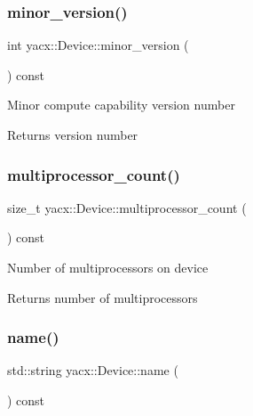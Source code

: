 \subsubsection{\texorpdfstring{minor\+\_\+version()}{minor\_version()}}
{\footnotesize\ttfamily int yacx\+::\+Device\+::minor\+\_\+version (\begin{DoxyParamCaption}{ }\end{DoxyParamCaption}) const\hspace{0.3cm}{\ttfamily [inline]}}

Minor compute capability version number \begin{DoxyReturn}{Returns}
version number 
\end{DoxyReturn}
\mbox{\label{classyacx_1_1_device_ae97aae54e13c2be6acbb1d0992ddd473}} 
\subsubsection{\texorpdfstring{multiprocessor\+\_\+count()}{multiprocessor\_count()}}
{\footnotesize\ttfamily size\+\_\+t yacx\+::\+Device\+::multiprocessor\+\_\+count (\begin{DoxyParamCaption}{ }\end{DoxyParamCaption}) const\hspace{0.3cm}{\ttfamily [inline]}}

Number of multiprocessors on device \begin{DoxyReturn}{Returns}
number of multiprocessors 
\end{DoxyReturn}
\mbox{\label{classyacx_1_1_device_a49388d8375dc98070973470f6cd997e8}} 
\subsubsection{\texorpdfstring{name()}{name()}}
{\footnotesize\ttfamily std\+::string yacx\+::\+Device\+::name (\begin{DoxyParamCaption}{ }\end{DoxyParamCaption}) const\hspace{0.3cm}{\ttfamily [inline]}}

